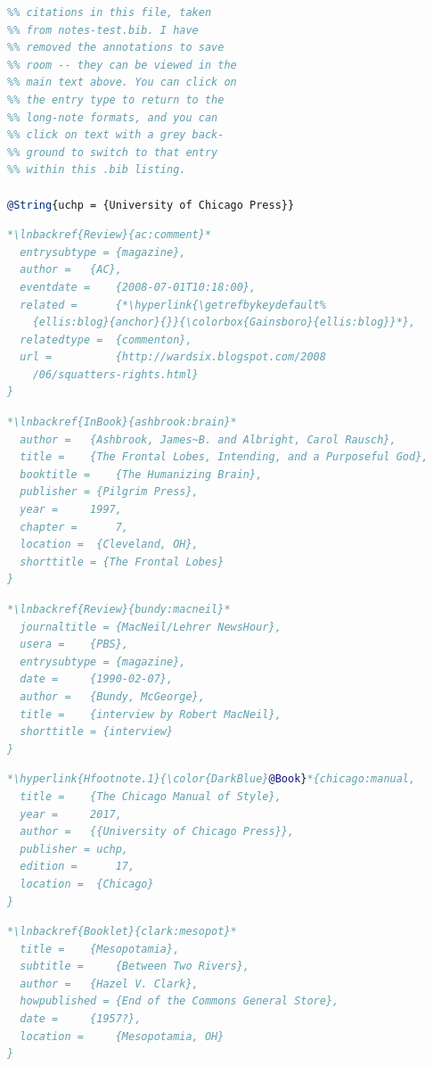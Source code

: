 \documentclass[a4paper,12pt]{article}
\begin{document}
\vspace*{-6pt}
\begin{lstlisting}[language=BibTeX,label=prologue]
%% Database entries used to produce
%% citations in this file, taken
%% from notes-test.bib. I have
%% removed the annotations to save
%% room -- they can be viewed in the
%% main text above. You can click on
%% the entry type to return to the
%% long-note formats, and you can
%% click on text with a grey back-
%% ground to switch to that entry
%% within this .bib listing.

@String{uchp = {University of Chicago Press}}
\end{lstlisting}
\begin{lstlisting}[language=BiBTeX,label=ac:comment]
*\lnbackref{Review}{ac:comment}*
  entrysubtype = {magazine},
  author = 	 {AC},
  eventdate = 	 {2008-07-01T10:18:00},
  related = 	 {*\hyperlink{\getrefbykeydefault%
    {ellis:blog}{anchor}{}}{\colorbox{Gainsboro}{ellis:blog}}*},
  relatedtype =  {commenton},
  url =          {http://wardsix.blogspot.com/2008
    /06/squatters-rights.html}
}
\end{lstlisting}
\begin{lstlisting}[language=BibTeX,label=ashbrook:brain]
*\lnbackref{InBook}{ashbrook:brain}*
  author = 	 {Ashbrook, James~B. and Albright, Carol Rausch},
  title = 	 {The Frontal Lobes, Intending, and a Purposeful God},
  booktitle = 	 {The Humanizing Brain},
  publisher = {Pilgrim Press},
  year = 	 1997,
  chapter = 	 7,
  location =  {Cleveland, OH},
  shorttitle = {The Frontal Lobes}
}
\end{lstlisting}
\begin{lstlisting}[language=BibTeX,label=bundy:macneil]
*\lnbackref{Review}{bundy:macneil}*
  journaltitle = {MacNeil/Lehrer NewsHour},
  usera = 	 {PBS},
  entrysubtype = {magazine},
  date = 	 {1990-02-07},
  author = 	 {Bundy, McGeorge},
  title = 	 {interview by Robert MacNeil},
  shorttitle = {interview}
}
\end{lstlisting}
\begin{lstlisting}[language=BibTeX,label=chicago:manual]
*\hyperlink{Hfootnote.1}{\color{DarkBlue}@Book}*{chicago:manual,
  title = 	 {The Chicago Manual of Style},
  year = 	 2017,
  author = 	 {{University of Chicago Press}},
  publisher = uchp,
  edition = 	 17,
  location =  {Chicago}
}
\end{lstlisting}
\begin{lstlisting}[language=BibTeX,label=clark:mesopot]
*\lnbackref{Booklet}{clark:mesopot}*
  title = 	 {Mesopotamia},
  subtitle = 	 {Between Two Rivers},
  author = 	 {Hazel V. Clark},
  howpublished = {End of the Commons General Store},
  date = 	 {1957?},
  location =     {Mesopotamia, OH}
}
\end{lstlisting}
\end{document}
